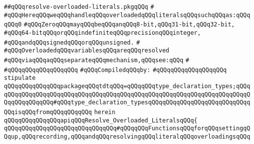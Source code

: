 \label{src/lib/compiler/front/typer/types/resolve-overloaded-literals.pkg}
\verb|##qQQqresolve-overloaded-literals.pkgqQQq|\newline
\verb|#|\newline
\verb|#qQQqHereqQQqweqQQqhandleqQQqoverloadedqQQqliteralsqQQqsuchqQQqas:qQQqqQQq0|\newline
\verb|#qQQqZeroqQQqmayqQQqbeqQQqanqQQq8-bit,qQQq31-bit,qQQq32-bit,|\newline
\verb|#qQQq64-bitqQQqorqQQqindefiniteqQQqprecisionqQQqinteger,|\newline
\verb|#qQQqandqQQqsignedqQQqorqQQqunsigned.|\newline
\verb|#|\newline
\verb|#qQQqOverloadedqQQqvariablesqQQqareqQQqresolved|\newline
\verb|#qQQqviaqQQqaqQQqseparateqQQqmechanism,qQQqsee:qQQq|\newline
\verb|#|\newline
\verb|#qQQqqQQqqQQqqQQqqQQq|\newline
\newline
\verb|#qQQqCompiledqQQqby:|\newline
\verb|#qQQqqQQqqQQqqQQqqQQq|\newline
\newline
\verb|stipulate|\newline
\verb|qQQqqQQqqQQqqQQqpackageqQQqtdtqQQq=qQQqqQQqtype_declaration_types;qQQqqQQqqQQqqQQqqQQqqQQqqQQqqQQqqQQqqQQqqQQqqQQqqQQqqQQqqQQqqQQqqQQqqQQqqQQqqQQqqQQqqQQq#qQQqtype_declaration_typesqQQqqQQqqQQqqQQqqQQqqQQqqQQqqQQqisqQQqfromqQQqqQQqqQQq|\newline
\verb|herein|\newline
\newline
\verb|qQQqqQQqqQQqqQQqapiqQQqResolve_Overloaded_LiteralsqQQq{|\newline
\newline
\verb|qQQqqQQqqQQqqQQqqQQqqQQqqQQqqQQq#qQQqqQQqFunctionsqQQqforqQQqsettingqQQqup,qQQqrecording,qQQqandqQQqresolvingqQQqliteralqQQqoverloadingsqQQq|\newline
\newline
